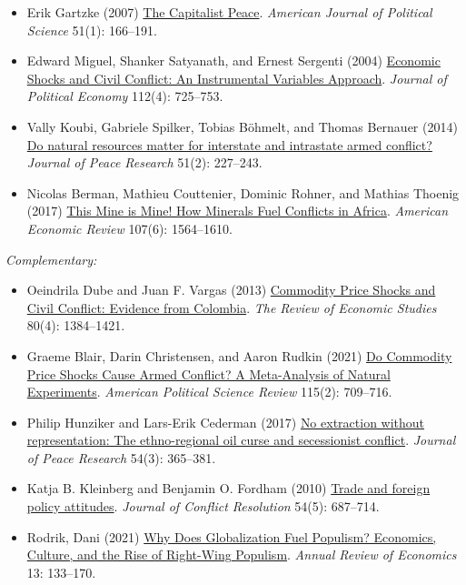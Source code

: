 \documentclass[12pt, a4paper]{article}
\begin{document}
\begin{itemize}
  \item Erik Gartzke (2007) \href{https://doi.org/10.1111/j.1540-5907.2007.00244.x}{The Capitalist Peace}. \textit{American Journal of Political Science} 51(1): 166--191.
	\item Edward Miguel, Shanker Satyanath, and Ernest Sergenti (2004) \href{https://doi.org/10.1086/421174}{Economic Shocks and Civil Conflict: An Instrumental Variables Approach}. \textit{Journal of Political Economy} 112(4): 725--753.
	\item Vally Koubi, Gabriele Spilker, Tobias Böhmelt, and Thomas Bernauer (2014) \href{https://doi.org/10.1177/002234331349345}{Do natural resources matter for interstate and intrastate armed conflict?} \textit{Journal of Peace Research} 51(2): 227--243.
	\item Nicolas Berman, Mathieu Couttenier, Dominic Rohner, and Mathias Thoenig (2017) \href{https://doi.org/10.1257/aer.20150774}{This Mine is Mine! How Minerals Fuel Conflicts in Africa}. \textit{American Economic Review} 107(6): 1564--1610.
\end{itemize}

\noindent\textit{Complementary:}

\begin{itemize}
	\item Oeindrila Dube and Juan F. Vargas (2013) \href{https://doi.org/10.1093/restud/rdt009}{Commodity Price Shocks and Civil Conflict: Evidence from Colombia}. \textit{The Review of Economic Studies} 80(4): 1384--1421.
	\item Graeme Blair, Darin Christensen, and Aaron Rudkin (2021) \href{https://doi.org/10.1017/S0003055420000957}{Do Commodity Price Shocks Cause Armed Conflict? A Meta-Analysis of Natural Experiments}. \textit{American Political Science Review} 115(2): 709--716.
	\item Philip Hunziker and Lars-Erik Cederman (2017) \href{https://doi.org/10.1177/0022343316687365}{No extraction without representation: The ethno-regional oil curse and secessionist conflict}. \textit{Journal of Peace Research} 54(3): 365--381.
	\item Katja B. Kleinberg and Benjamin O. Fordham (2010) \href{https://doi.org/10.1177/0022002710364128}{Trade and foreign policy attitudes}. \textit{Journal of Conflict Resolution} 54(5): 687--714.
  \item Rodrik, Dani (2021) \href{https://doi.org/10.1146/annurev-economics-070220-032416}{Why Does Globalization Fuel Populism? Economics, Culture, and the Rise of Right-Wing Populism}. \textit{Annual Review of Economics} 13: 133--170.
\end{itemize}
\end{document}
